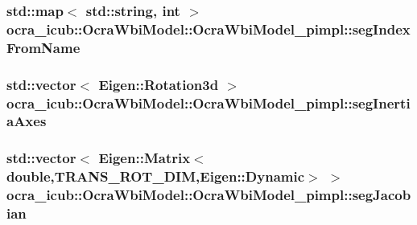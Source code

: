\hypertarget{structOcraWbiModel_1_1OcraWbiModel__pimpl_ad172a7f70ea862fa849e859dc3c8e4f1}{
\subsubsection[{seg\-Index\-From\-Name}]{\setlength{\rightskip}{0pt plus 5cm}std\-::map$<$ std\-::string, int $>$ {\bf ocra\-\_\-icub\-::\-Ocra\-Wbi\-Model\-::\-Ocra\-Wbi\-Model\-\_\-pimpl\-::seg\-Index\-From\-Name}}}\label{structOcraWbiModel_1_1OcraWbiModel__pimpl_ad172a7f70ea862fa849e859dc3c8e4f1}
\hypertarget{structOcraWbiModel_1_1OcraWbiModel__pimpl_aba2d3ed2e0c2a1a1b8b4d40c3df6a4a5}{
\subsubsection[{seg\-Inertia\-Axes}]{\setlength{\rightskip}{0pt plus 5cm}std\-::vector$<$ \-Eigen\-::\-Rotation3d $>$ {\bf ocra\-\_\-icub\-::\-Ocra\-Wbi\-Model\-::\-Ocra\-Wbi\-Model\-\_\-pimpl\-::seg\-Inertia\-Axes}}}\label{structOcraWbiModel_1_1OcraWbiModel__pimpl_aba2d3ed2e0c2a1a1b8b4d40c3df6a4a5}
\hypertarget{structOcraWbiModel_1_1OcraWbiModel__pimpl_a3430097cc1a200a4ff5abcafd52a7d44}{
\subsubsection[{seg\-Jacobian}]{\setlength{\rightskip}{0pt plus 5cm}std\-::vector$<$ \-Eigen\-::\-Matrix$<$double,{\bf \-T\-R\-A\-N\-S\-\_\-\-R\-O\-T\-\_\-\-D\-I\-M},\-Eigen\-::\-Dynamic$>$ $>$ {\bf ocra\-\_\-icub\-::\-Ocra\-Wbi\-Model\-::\-Ocra\-Wbi\-Model\-\_\-pimpl\-::seg\-Jacobian}}}\label{structOcraWbiModel_1_1OcraWbiModel__pimpl_a3430097cc1a200a4ff5abcafd52a7d44}
